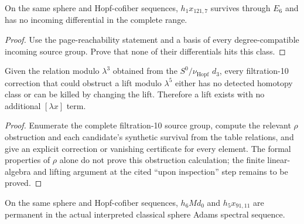 \begin{proposition}[$h_1x_{121,7}$ evidence]
  \label{evidence:h_1_mul_x_121_7}
  \notready
  On the same sphere and Hopf-cofiber sequences,
  $h_1x_{121,7}$ survives through $E_6$ and has no incoming
  differential in the complete range.
\end{proposition}

\begin{proof}
  Use the page-reachability statement and a basis of every degree-compatible
  incoming source group. Prove that none of their differentials hits this class.
\end{proof}

\begin{proposition}
  \label{evidence:nu-extension-obstruction-vanishing}
  \notready
  Given the relation modulo $\lambda^3$ obtained from the
  $S^0/\nu_{\mathrm{Hopf}}$ $d_3$, every filtration-10 correction that could
  obstruct a lift modulo
  $\lambda^5$ either has no detected homotopy class or can be killed by changing
  the lift.  Therefore a lift exists with no additional $[\lambda x]$ term.
\end{proposition}

\begin{proof}
  Enumerate the complete filtration-10 source group, compute the relevant
  $\rho$ obstruction and each candidate's synthetic survival from the table
  relations, and give an explicit correction or vanishing certificate for
  every element. The formal properties of $\rho$ alone do not prove this
  obstruction calculation; the finite linear-algebra and lifting argument
  at the cited ``upon inspection'' step remains to be proved.
\end{proof}

\begin{proposition}
  \label{evidence:stem122-permanent}
  \notready
  On the same sphere and Hopf-cofiber sequences,
  $h_6Md_0$ and $h_5x_{91,11}$ are permanent in the actual interpreted
  classical sphere Adams spectral sequence.
\end{proposition}

